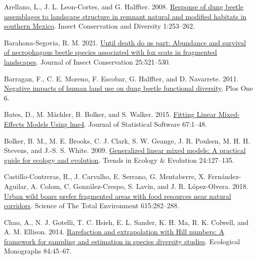 \documentclass[
  man, donotrepeattitle]{apa6}
\newlength{\cslhangindent}
\newenvironment{CSLReferences}[2] %
 {\begin{list}{}{%
  \setlength{\itemindent}{0pt}
  \setlength{\leftmargin}{0pt}
  \setlength{\parsep}{0pt}
  \ifodd #1
   \setlength{\leftmargin}{\cslhangindent}
   \setlength{\itemindent}{-1\cslhangindent}
  \fi
  \setlength{\itemsep}{#2\baselineskip}}}
 {\end{list}}
\begin{document}
\label{refs}
\begin{CSLReferences}{1}{0}
Arellano, L., J. L. Leon-Cortes, and G. Halffter. 2008. \href{https://doi.org/10.1111/j.1752-4598.2008.00033.x}{Response of dung beetle assemblages to landscape structure in remnant natural and modified habitats in southern {Mexico}}. Insect Conservation and Diversity 1:253--262.

Barahona-Segovia, R. M. 2021. \href{https://doi.org/10.1007/s10841-021-00320-z}{Until death do us part: Abundance and survival of necrophagous beetle species associated with fox scats in fragmented landscapes}. Journal of Insect Conservation 25:521--530.

Barragan, F., C. E. Moreno, F. Escobar, G. Halffter, and D. Navarrete. 2011. \href{https://doi.org/10.1371/journal.pone.0017976}{Negative impacts of human land use on dung beetle functional diversity}. Plos One 6.

Bates, D., M. Mächler, B. Bolker, and S. Walker. 2015. \href{https://doi.org/10.18637/jss.v067.i01}{Fitting {Linear} {Mixed}-{Effects} {Models} {Using} lme4}. Journal of Statistical Software 67:1--48.

Bolker, B. M., M. E. Brooks, C. J. Clark, S. W. Geange, J. R. Poulsen, M. H. H. Stevens, and J.-S. S. White. 2009. \href{https://doi.org/10.1016/j.tree.2008.10.008}{Generalized linear mixed models: A practical guide for ecology and evolution}. Trends in Ecology \& Evolution 24:127--135.

Castillo-Contreras, R., J. Carvalho, E. Serrano, G. Mentaberre, X. Fernández-Aguilar, A. Colom, C. González-Crespo, S. Lavín, and J. R. López-Olvera. 2018. \href{https://doi.org/10.1016/j.scitotenv.2017.09.277}{Urban wild boars prefer fragmented areas with food resources near natural corridors}. Science of The Total Environment 615:282--288.

Chao, A., N. J. Gotelli, T. C. Hsieh, E. L. Sander, K. H. Ma, R. K. Colwell, and A. M. Ellison. 2014. \href{https://doi.org/10.1890/13-0133.1}{Rarefaction and extrapolation with {Hill} numbers: A framework for sampling and estimation in species diversity studies}. Ecological Monographs 84:45--67.


\end{CSLReferences}
\end{document}

